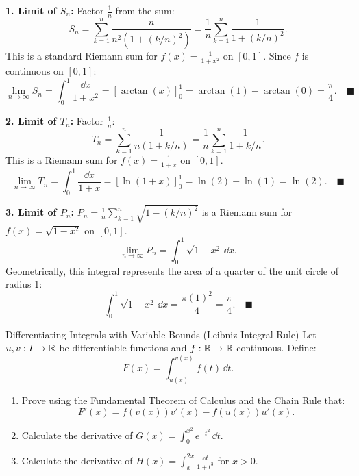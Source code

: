 \begin{tabletworkspace}[5.0cm]
\end{tabletworkspace}

\begin{solution}
\textbf{1. Limit of $S_n$:}
Factor $\frac{1}{n}$ from the sum:
\[
S_n = \sum_{k=1}^n \frac{n}{n^2(1 + (k/n)^2)} = \frac{1}{n} \sum_{k=1}^n \frac{1}{1 + (k/n)^2}.
\]
This is a standard Riemann sum for $f(x) = \frac{1}{1 + x^2}$ on $[0, 1]$.
Since $f$ is continuous on $[0, 1]$:
\[
\lim_{n \to \infty} S_n = \int_0^1 \frac{\dd x}{1 + x^2} = [\arctan(x)]_0^1 = \arctan(1) - \arctan(0) = \frac{\pi}{4}. \quad \blacksquare
\]

\textbf{2. Limit of $T_n$:}
Factor $\frac{1}{n}$:
\[
T_n = \sum_{k=1}^n \frac{1}{n(1 + k/n)} = \frac{1}{n} \sum_{k=1}^n \frac{1}{1 + k/n}.
\]
This is a Riemann sum for $f(x) = \frac{1}{1 + x}$ on $[0, 1]$.
\[
\lim_{n \to \infty} T_n = \int_0^1 \frac{\dd x}{1 + x} = [\ln(1 + x)]_0^1 = \ln(2) - \ln(1) = \ln(2). \quad \blacksquare
\]

\textbf{3. Limit of $P_n$:}
$P_n = \frac{1}{n} \sum_{k=1}^n \sqrt{1 - (k/n)^2}$ is a Riemann sum for $f(x) = \sqrt{1 - x^2}$ on $[0, 1]$.
\[
\lim_{n \to \infty} P_n = \int_0^1 \sqrt{1 - x^2}\,\dd x.
\]
Geometrically, this integral represents the area of a quarter of the unit circle of radius 1:
\[
\int_0^1 \sqrt{1 - x^2}\,\dd x = \frac{\pi (1)^2}{4} = \frac{\pi}{4}. \quad \blacksquare
\]
\end{solution}

\begin{exercise}{Differentiating Integrals with Variable Bounds (Leibniz Integral Rule)}
Let $u, v: I \to \mathbb{R}$ be differentiable functions and $f: \mathbb{R} \to \mathbb{R}$ continuous.
Define:
\[
F(x) = \int_{u(x)}^{v(x)} f(t)\,\dd t.
\]
\begin{enumerate}[leftmargin=1.5em,itemsep=2pt]
  \item Prove using the Fundamental Theorem of Calculus and the Chain Rule that:
  \[
  F'(x) = f(v(x)) v'(x) - f(u(x)) u'(x).
  \]
  \item Calculate the derivative of $G(x) = \int_{0}^{x^2} e^{-t^2}\,\dd t$.
  \item Calculate the derivative of $H(x) = \int_{x}^{2x} \frac{\dd t}{1 + t^3}$ for $x > 0$.
\end{enumerate}
\end{exercise}

